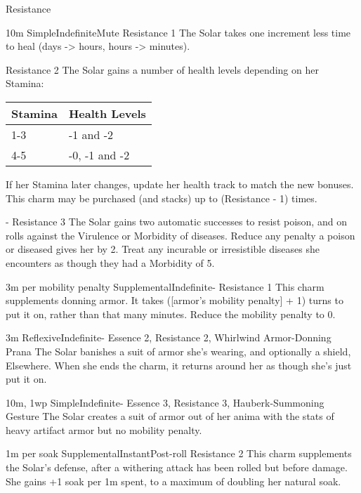 \begin{Ability}{Resistance}

  {10m}
  {Simple}{Indefinite}{Mute}
  {Resistance 1}
  The Solar takes one increment less time to heal (days -> hours, hours -> minutes).

  {Resistance 2}
  The Solar gains a number of health levels depending on her Stamina:

  \begin{tabular}{ll}
    Stamina & Health Levels\\
    \hline
    1-3 & -1 and -2 \\
    4-5 & -0, -1 and -2 \\
  \end{tabular}

  If her Stamina later changes, update her health track to match the new bonuses. This charm may be purchased (and stacks) up to (Resistance - 1) times.

  {-}
  {Resistance 3}
  The Solar gains two automatic successes to resist poison, and on rolls against the Virulence or Morbidity of diseases. Reduce any penalty a poison or diseased gives her by 2. Treat any incurable or irresistible diseases she encounters as though they had a Morbidity of 5.

  {3m per mobility penalty}
  {Supplemental}{Indefinite}{-}
  {Resistance 1}
  This charm supplements donning armor. It takes ([armor's mobility penalty] + 1) turns to put it on, rather than that many minutes. Reduce the mobility penalty to 0.

  {3m}
  {Reflexive}{Indefinite}{-}
  {Essence 2, Resistance 2, Whirlwind Armor-Donning Prana}
  The Solar banishes a suit of armor she's wearing, and optionally a shield, Elsewhere. When she ends the charm, it returns around her as though she's just put it on.

  {10m, 1wp}
  {Simple}{Indefinite}{-}
  {Essence 3, Resistance 3, Hauberk-Summoning Gesture}
  The Solar creates a suit of armor out of her anima with the stats of heavy artifact armor but no mobility penalty.

  {1m per soak}
  {Supplemental}{Instant}{Post-roll}
  {Resistance 2}
  This charm supplements the Solar's defense, after a withering attack has been rolled but before damage. She gains +1 soak per 1m spent, to a maximum of doubling her natural soak.


\end{Ability}
